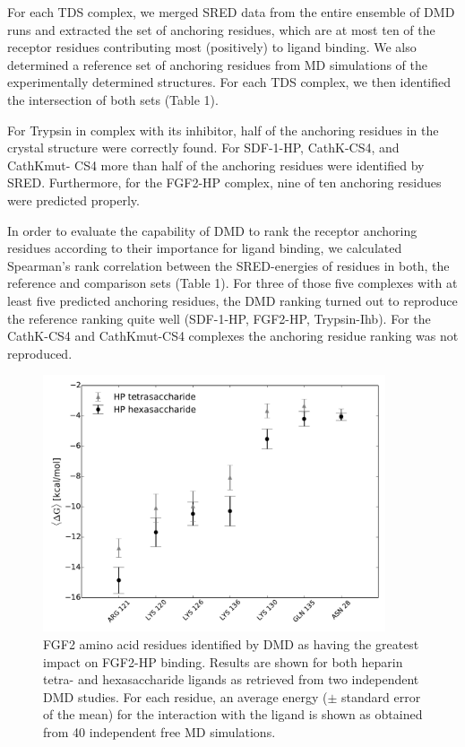 For each TDS complex, we merged SRED data from the entire ensemble of DMD runs
and extracted the set of anchoring residues, which are at most ten of the
receptor residues contributing most (positively) to ligand binding. We also
determined a reference set of anchoring residues from MD simulations of the
experimentally determined structures. For each TDS complex, we then identified
the intersection of both sets (Table 1).


For Trypsin in complex with its inhibitor, half of the anchoring residues in the
crystal structure were correctly found. For SDF-1-HP, CathK-CS4, and CathKmut-
CS4 more than half of the anchoring residues were identified by SRED.
Furthermore, for the FGF2-HP complex, nine of ten anchoring residues were
predicted properly.

In order to evaluate the capability of DMD to rank the receptor anchoring
residues according to their importance for ligand binding, we calculated
Spearman's rank correlation between the SRED-energies of residues in both, the
reference and comparison sets (Table 1). For three of those five complexes with
at least five predicted anchoring residues, the DMD ranking turned out to
reproduce the reference ranking quite well (SDF-1-HP, FGF2-HP, Trypsin-Ihb). For
the CathK-CS4 and CathKmut-CS4 complexes the anchoring residue ranking was not
reproduced.

\begin{figure}
\centering
\includegraphics[width=0.9\textwidth]{gfx/dmd/figure_6_receptor_top7_residues_of_top_40percent_dmd_runs.pdf}
\caption[]{
FGF2 amino acid residues identified by DMD as having the greatest impact on
FGF2-HP binding. Results are shown for both heparin tetra- and hexasaccharide
ligands as retrieved from two independent DMD studies. For each residue, an
average energy ($\pm$ standard error of the mean) for the interaction with the
ligand is shown as obtained from 40 independent free MD simulations.
}
\label{fig:dmd:sred_fgf2}
\end{figure}

